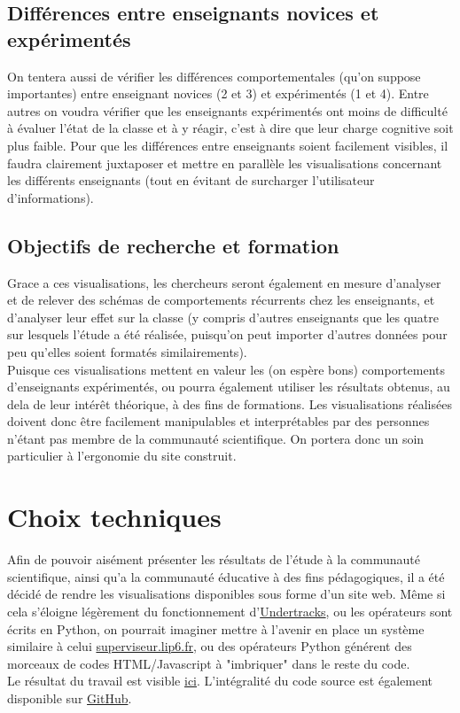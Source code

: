 \documentclass{article}
\begin{document}
\subsection{Différences entre enseignants novices et expérimentés}
On tentera aussi de vérifier les différences comportementales (qu'on suppose importantes) entre enseignant novices (2 et 3) et expérimentés (1 et 4). Entre autres on voudra vérifier que les enseignants expérimentés ont moins de difficulté à évaluer l'état de la classe et à y réagir, c'est à dire que leur charge cognitive soit plus faible. Pour que les différences entre enseignants soient facilement visibles, il faudra clairement juxtaposer et mettre en parallèle les visualisations concernant les différents enseignants (tout en évitant de surcharger l'utilisateur d'informations).

\subsection{Objectifs de recherche et formation}
Grace a ces visualisations, les chercheurs seront également en mesure d'analyser et de relever des schémas de comportements récurrents chez les enseignants, et d'analyser leur effet sur la classe (y compris d'autres enseignants que les quatre sur lesquels l'étude a été réalisée, puisqu'on peut importer d'autres données pour peu qu'elles soient formatés similairements).\\
Puisque ces visualisations mettent en valeur les (on espère bons) comportements d'enseignants expérimentés, ou pourra également utiliser les résultats obtenus, au dela de leur intérêt théorique, à des fins de formations. Les visualisations réalisées doivent donc être facilement manipulables et interprétables par des personnes n'étant pas membre de la communauté scientifique. On portera donc un soin particulier à l'ergonomie du site construit.

\section{Choix techniques}
Afin de pouvoir aisément présenter les résultats de l'étude à la communauté scientifique, ainsi qu'a la communauté éducative à des fins pédagogiques, il a été décidé de rendre les visualisations disponibles sous forme d'un site web. Même si cela s'éloigne légèrement du fonctionnement d'\href{https://undertracks.imag.fr}{Undertracks}, ou les opérateurs sont écrits en Python, on pourrait imaginer mettre à l'avenir en place un système similaire à celui \href{http://superviseur.lip6.fr}{superviseur.lip6.fr}, ou des opérateurs Python générent des morceaux de codes HTML/Javascript à "imbriquer" dans le reste du code.\\
Le résultat du travail est visible \href{https://vertmo.github.io/SuperViseur/}{ici}. L'intégralité du code source est également disponible sur \href{https://github.com/Vertmo/SuperViseur}{GitHub}.
\end{document}
